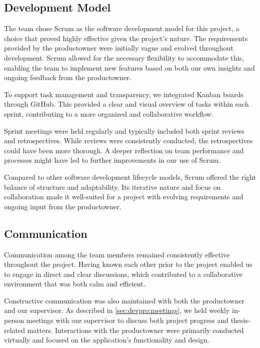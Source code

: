 \subsection{Development Model}

The team chose Scrum as the software development model for this project, a choice that proved highly effective given the project's nature. The requirements provided by the \gls{productowner} were initially vague and evolved throughout development. Scrum allowed for the necessary flexibility to accommodate this, enabling the team to implement new features based on both our own insights and ongoing feedback from the \gls{productowner}.

To support task management and transparency, we integrated Kanban boards through GitHub. This provided a clear and visual overview of tasks within each sprint, contributing to a more organized and collaborative workflow.

Sprint meetings were held regularly and typically included both sprint reviews and retrospectives. While reviews were consistently conducted, the retrospectives could have been more thorough. A deeper reflection on team performance and processes might have led to further improvements in our use of Scrum.

Compared to other software development lifecycle models, Scrum offered the right balance of structure and adaptability. Its iterative nature and focus on collaboration made it well-suited for a project with evolving requirements and ongoing input from the \gls{productowner}.

\subsection{Communication}

Communication among the team members remained consistently effective throughout the project. Having known each other prior to the project enabled us to engage in direct and clear discussions, which contributed to a collaborative environment that was both calm and efficient.

Constructive communication was also maintained with both the \gls{productowner} and our supervisor. As described in \autoref{sec:devpro:meetings}, we held weekly in-person meetings with our supervisor to discuss both project progress and thesis-related matters. Interactions with the \gls{productowner} were primarily conducted virtually and focused on the application's functionality and design.

